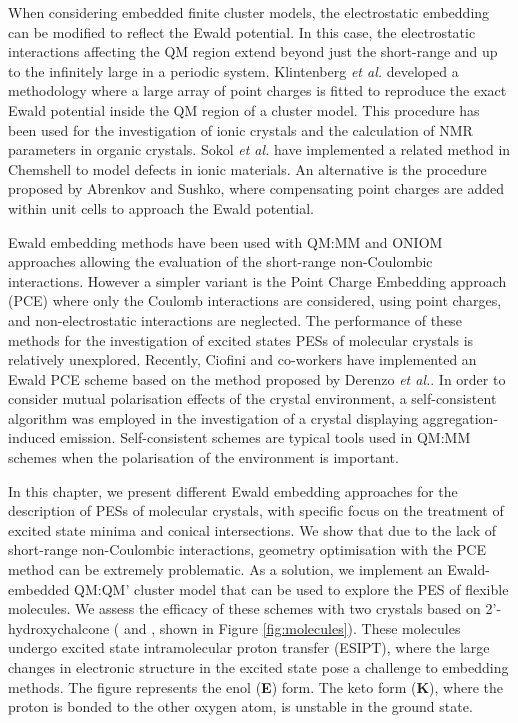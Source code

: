 When considering embedded finite cluster models, the electrostatic embedding can be modified to reflect the Ewald potential. In this case, the electrostatic interactions affecting the QM region extend beyond just the short-range and up to the infinitely large in a periodic system. Klintenberg \textit{et al.} developed a methodology where a large array of point charges is fitted to reproduce the exact Ewald potential inside the QM region of a cluster model.\cite{Klintenberg2000,Derenzo2000,Weber2010} This procedure has been used for the investigation of ionic crystals and the calculation of NMR parameters in organic crystals.\cite{Jug2004,Weber2010,Stueber2001} Sokol \textit{et al.} have implemented a related method in Chemshell to model defects in ionic materials.\cite{Sokol2004,Metz2014} An alternative is the procedure proposed by Abrenkov and Sushko, where compensating point charges are added within unit cells to approach the Ewald potential.\cite{Abarenkov2007,Sushko2010}   

Ewald embedding methods have been used with QM:MM and ONIOM approaches allowing the evaluation of the short-range non-Coulombic interactions.\cite{Kobayashi2015a,Nam2005a,Wang2013a,Sushko2013a,Sousa2013a,Cui2011a} However a simpler variant is the Point Charge Embedding approach (PCE) where only the Coulomb interactions are considered, using point charges, and non-electrostatic interactions are neglected.\cite{SeveroPereiraGomes2012a,Weber2010} The performance of these  methods for the investigation of excited states PESs of molecular crystals is relatively unexplored. Recently, Ciofini and co-workers\cite{Wilbraham2016a,Presti2017,Wilbraham2018} have implemented an Ewald PCE scheme based on the method proposed by Derenzo \textit{et al.}.\cite{Derenzo2000} In order to consider mutual polarisation effects of the crystal environment, a self-consistent algorithm was employed in the investigation of a crystal displaying aggregation-induced emission.\cite{Presti2017} Self-consistent schemes are typical tools used in QM:MM schemes when the polarisation of the environment is important.\cite{Cieplak2009,Warshel2007,Xie2007}

In this chapter, we present different Ewald embedding approaches for the description of PESs of molecular crystals, with specific focus on the treatment of excited state minima and conical intersections. We show that due to the lack of short-range non-Coulombic interactions, geometry optimisation with the PCE method can be extremely problematic. As a solution, we implement an Ewald-embedded QM:QM' cluster model that can be used to explore the PES of flexible molecules. We assess the efficacy of these schemes with two crystals based on 2'-hydroxychalcone (\HC{} and \HCC{}, shown in Figure \ref{fig:molecules}). These molecules undergo excited state intramolecular proton transfer (ESIPT), where the large changes in electronic structure in the excited state pose a challenge to embedding methods. The figure represents the enol (\textbf{E}) form. The keto form (\textbf{K}), where the proton is bonded to the other oxygen atom, is unstable in the ground state.

